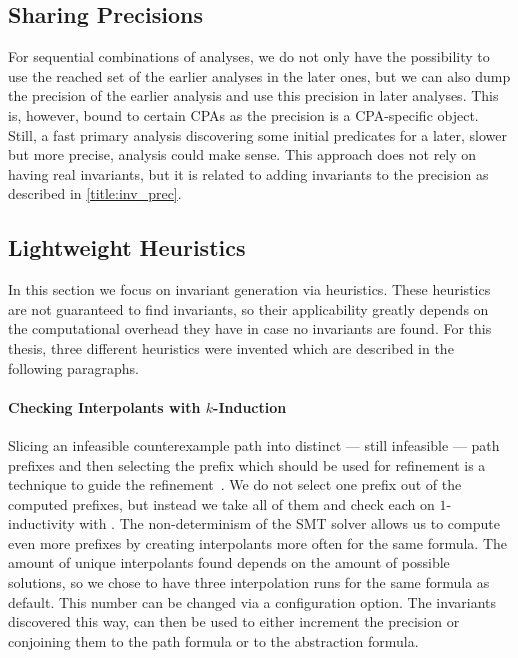 \subsection{Sharing Precisions}
For sequential combinations of analyses, we do not only have the possibility to use the reached set of the earlier analyses in the later ones, but we can also dump the precision of the earlier 
analysis and use this precision in later analyses. This is, however, bound to certain \acp{CPA} as the precision is a \ac{CPA}-specific object. Still, a fast primary analysis discovering some initial 
predicates for a later, slower but more precise, analysis could make sense. This approach does not rely on having real invariants, but it is related to adding invariants to the precision as described 
in \autoref{title:inv_prec}.


\subsection{Lightweight Heuristics}\label{title:lightweightHeuristics}
In this section we focus on invariant generation via heuristics. These heuristics are not guaranteed to find invariants, so their applicability greatly depends on the computational overhead they 
have in case no invariants are found. For this thesis, three different heuristics were invented which are described in the following paragraphs.

\paragraph{Checking Interpolants with $k$-Induction}
Slicing an infeasible counterexample path into distinct --- still infeasible --- path prefixes and then selecting the prefix which should be used for refinement is a technique to guide the
refinement~\cite{Beyer:RefinementSelection}. We do not select one prefix out of the computed prefixes, but instead we take all of them and check each on $1$-inductivity with \Kinduction{}. The
non-determinism of the \ac{SMT} solver allows us to compute even more prefixes by creating interpolants more often for the same formula. The amount of unique interpolants found depends on the amount of 
possible solutions, so we chose to have three interpolation runs for the same formula as default. This number can be changed via a configuration option. The invariants discovered this way, can then be
used to either increment the precision or conjoining them to the path formula or to the abstraction formula.

